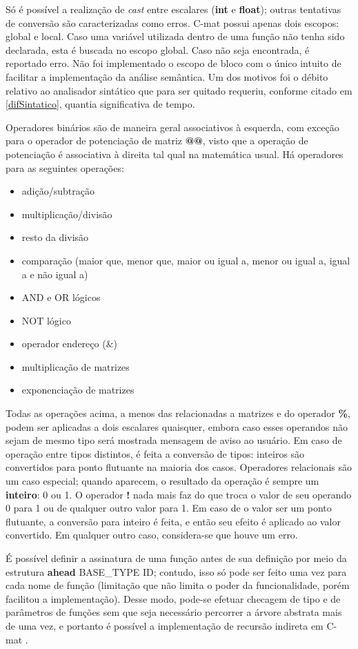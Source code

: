 \documentclass[
	article,			%
	11pt,				%
	oneside,			%
	a4paper,			%
	english,			%
	brazil,				%
	sumario=tradicional
	]{abntex2}
\renewcommand{\it}[1]{\textit{#1}}
\renewcommand{\bf}[1]{\textbf{#1}}
\begin{document}
Só é possível a realização de \it{cast} entre escalares (\bf{int} e \bf{float}); outras tentativas de conversão são caracterizadas como erros. C-mat possui apenas dois escopos: global e local. Caso uma variável utilizada dentro de uma função não tenha sido declarada, esta é buscada no escopo global. Caso não seja encontrada, é reportado erro. Não foi implementado o escopo de bloco com o
único intuito de facilitar a implementação da análise semântica. Um dos motivos foi o débito relativo ao analisador sintático que para ser quitado requeriu, conforme citado em \ref{difSintatico}, quantia significativa de tempo.

Operadores binários são de maneira geral associativos à esquerda, com exceção para o operador de potenciação de matriz \bf{@@}, visto que a operação de potenciação é associativa à direita tal qual na matemática usual. Há operadores para as seguintes operações:
\begin{itemize}
	\item adição/subtração
	\item multiplicação/divisão
	\item resto da divisão
	\item comparação (maior que, menor que, maior ou igual a, menor ou igual a, igual a e não igual a)
	\item AND e OR lógicos
	\item NOT lógico
	\item operador endereço (\&)
	\item multiplicação de matrizes
	\item exponenciação de matrizes
\end{itemize}

Todas as operações acima, a menos das relacionadas a matrizes e do operador \bf{\%}, podem ser aplicadas a dois escalares quaisquer, embora caso esses operandos não sejam de mesmo tipo será mostrada mensagem de aviso ao usuário. Em caso de operação entre tipos distintos, é feita a conversão de tipos: inteiros são convertidos para ponto flutuante na maioria dos casos. Operadores relacionais são um caso especial; quando aparecem, o resultado da operação é sempre um \bf{inteiro}: 0 ou 1. O operador \bf{!} nada mais faz do que troca o valor de seu operando 0 para 1 ou de qualquer outro valor para 1. Em caso de o valor ser um ponto flutuante, a conversão para inteiro é feita, e então seu efeito é aplicado ao valor convertido. Em qualquer outro caso, considera-se que houve um erro.

É possível definir a assinatura de uma função antes de sua definição por meio da estrutura \bf{ahead} BASE\_TYPE ID; contudo, isso só pode ser feito uma vez para cada nome de função (limitação que não limita o poder da funcionalidade, porém facilitou a implementação). Desse modo, pode-se efetuar checagem de tipo e de parâmetros de funções sem que seja necessário percorrer a árvore abstrata mais de uma vez, e portanto é possível a implementação de recursão indireta em C-mat .
\end{document}
